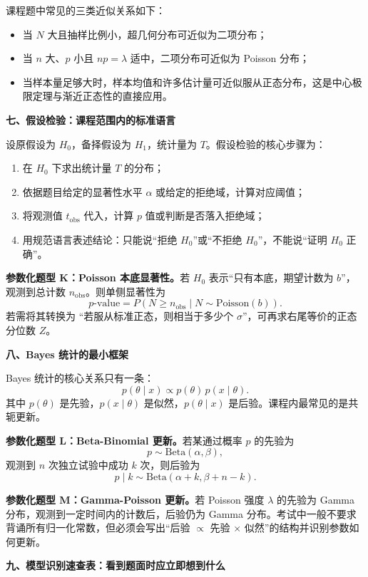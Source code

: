 课程题中常见的三类近似关系如下：
\begin{itemize}[leftmargin=2em,itemsep=0.12em,topsep=0.12em]
  \item 当 $N$ 大且抽样比例小，超几何分布可近似为二项分布；
  \item 当 $n$ 大、$p$ 小且 $np=\lambda$ 适中，二项分布可近似为 Poisson 分布；
  \item 当样本量足够大时，样本均值和许多估计量可近似服从正态分布，这是中心极限定理与渐近正态性的直接应用。
\end{itemize}

\textbf{七、假设检验：课程范围内的标准语言}

设原假设为 $H_0$，备择假设为 $H_1$，统计量为 $T$。假设检验的核心步骤为：
\begin{enumerate}
  \item 在 $H_0$ 下求出统计量 $T$ 的分布；
  \item 依据题目给定的显著性水平 $\alpha$ 或给定的拒绝域，计算对应阈值；
  \item 将观测值 $t_{\mathrm{obs}}$ 代入，计算 $p$ 值或判断是否落入拒绝域；
  \item 用规范语言表述结论：只能说“拒绝 $H_0$”或“不拒绝 $H_0$”，不能说“证明 $H_0$ 正确”。
\end{enumerate}

\textbf{参数化题型 K：Poisson 本底显著性。}若 $H_0$ 表示“只有本底，期望计数为 $b$”，观测到总计数 $n_{\mathrm{obs}}$。则单侧显著性为
\[
p\text{-value}=P(N\ge n_{\mathrm{obs}}\mid N\sim \mathrm{Poisson}(b)).
\]
若需将其转换为 ``若服从标准正态，则相当于多少个 $\sigma$''，可再求右尾等价的正态分位数 $Z$。

\textbf{八、Bayes 统计的最小框架}

Bayes 统计的核心关系只有一条：
\[
p(\theta\mid x)\propto p(\theta)\,p(x\mid \theta).
\]
其中 $p(\theta)$ 是先验，$p(x\mid\theta)$ 是似然，$p(\theta\mid x)$ 是后验。课程内最常见的是共轭更新。

\textbf{参数化题型 L：Beta-Binomial 更新。}若某通过概率 $p$ 的先验为
\[
p\sim \mathrm{Beta}(\alpha,\beta),
\]
观测到 $n$ 次独立试验中成功 $k$ 次，则后验为
\[
p\mid k \sim \mathrm{Beta}(\alpha+k,\beta+n-k).
\]

\textbf{参数化题型 M：Gamma-Poisson 更新。}若 Poisson 强度 $\lambda$ 的先验为 Gamma 分布，观测到一定时间内的计数后，后验仍为 Gamma 分布。考试中一般不要求背诵所有归一化常数，但必须会写出“后验 $\propto$ 先验 $\times$ 似然”的结构并识别参数如何更新。

\textbf{九、模型识别速查表：看到题面时应立即想到什么}


